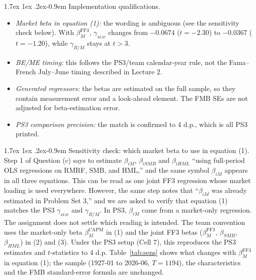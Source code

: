 \documentclass[11pt]{article}
\makeatletter
\renewcommand\paragraph{\@startsection{paragraph}{4}{0pt}%
  {1.7ex \@plus 1ex \@minus .2ex}{-0.9em}%
  {\normalfont\bfseries\normalsize\color{psink}}}
\newenvironment{tight}
  {\begin{itemize}\setlength{\itemsep}{3pt}\setlength{\parskip}{0pt}%
   \setlength{\topsep}{3pt}\setlength{\leftmargini}{1.4em}}
  {\end{itemize}}
\makeatother
\begin{document}
\paragraph{Implementation qualifications.}
\begin{tight}
  \item \emph{Market beta in equation (1):} the wording is ambiguous (see the sensitivity
  check below). With $\beta_M^{\mathrm{FF3}}$, $\gamma_{size}$ changes from $-0.0674$ ($t = -2.30$)
  to $-0.0367$ ($t = -1.20$), while $\gamma_{B/M}$ stays at $t > 3$.
  \item \emph{BE/ME timing:} this follows the PS3/team calendar-year rule, not the
  Fama--French July--June timing described in Lecture 2.
  \item \emph{Generated regressors:} the betas are estimated on the full sample, so they
  contain measurement error and a look-ahead element. The FMB SEs are not adjusted for
  beta-estimation error.
  \item \emph{PS3 comparison precision:} the match is confirmed to 4 d.p., which is all
  PS3 printed.
\end{tight}

\paragraph{Sensitivity check: which market beta to use in equation (1).}
Step 1 of Question (c) says to estimate $\beta_{iM}$, $\beta_{iSMB}$ and $\beta_{iHML}$
``using full-period OLS regressions on RMRF, SMB, and HML,'' and the same symbol
$\beta_{iM}$ appears in all three equations. This can be read as one joint FF3 regression
whose market loading is used everywhere. However, the same step notes that ``$\beta_{iM}$
was already estimated in Problem Set 3,'' and we are asked to verify that equation (1)
matches the PS3 $\gamma_{size}$ and $\gamma_{B/M}$. In PS3, $\beta_{iM}$ came from a
market-only regression. The assignment does not settle which reading is intended. The
team convention uses the market-only beta $\beta_M^{\mathrm{CAPM}}$ in (1) and the joint FF3
betas ($\beta_M^{\mathrm{FF3}}$, $\beta_{SMB}$, $\beta_{HML}$) in (2) and (3). Under the PS3 setup
(Cell 7), this reproduces the PS3 estimates and $t$-statistics to 4 d.p. Table~\ref{tab:sens}
shows what changes with $\beta_M^{\mathrm{FF3}}$ in equation (1); the sample (1927-01 to 2026-06,
$T = 1194$), the characteristics and the FMB standard-error formula are unchanged.
\end{document}
